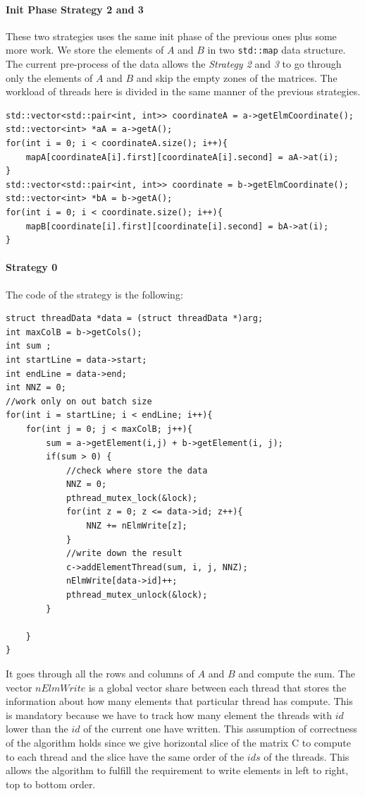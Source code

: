 \documentclass[]{article}
\begin{document}
\paragraph{Init Phase Strategy 2 and 3}
These two strategies uses the same init phase of the previous ones plus some more work.
We store the elements of $A$ and $B$ in two \texttt{std::map} data structure. The current pre-process of the data allows the \textit{Strategy 2} and \textit{3} to go through only the elements of $A$ and $B$ and skip the empty zones of the matrices.
The workload of threads here is divided in the same manner of the previous strategies.
\begin{lstlisting}[style=customc]
std::vector<std::pair<int, int>> coordinateA = a->getElmCoordinate();
std::vector<int> *aA = a->getA();
for(int i = 0; i < coordinateA.size(); i++){
    mapA[coordinateA[i].first][coordinateA[i].second] = aA->at(i);
}
std::vector<std::pair<int, int>> coordinate = b->getElmCoordinate();
std::vector<int> *bA = b->getA();
for(int i = 0; i < coordinate.size(); i++){
    mapB[coordinate[i].first][coordinate[i].second] = bA->at(i);
}
\end{lstlisting}



\label{strategy:0}
\paragraph{Strategy 0}
The code of the strategy is the following:
\begin{lstlisting}[style=customc]
struct threadData *data = (struct threadData *)arg;
int maxColB = b->getCols();
int sum ;
int startLine = data->start;
int endLine = data->end;
int NNZ = 0;
//work only on out batch size
for(int i = startLine; i < endLine; i++){
    for(int j = 0; j < maxColB; j++){
        sum = a->getElement(i,j) + b->getElement(i, j);
        if(sum > 0) {
            //check where store the data
            NNZ = 0;
            pthread_mutex_lock(&lock);
            for(int z = 0; z <= data->id; z++){
                NNZ += nElmWrite[z];
            }
            //write down the result
            c->addElementThread(sum, i, j, NNZ);
            nElmWrite[data->id]++;
            pthread_mutex_unlock(&lock);
        }
    
    }
}
\end{lstlisting}
It goes through all the rows and columns of $A$ and $B$ and compute the sum.
The vector $nElmWrite$ is a global vector share between each thread that stores the information about how many elements that particular thread has compute. This is mandatory because we have to track how many element the threads with $id$ lower than the $id$ of the current one have written. This assumption of correctness of the algorithm holds since we give horizontal slice of the matrix C to compute to each thread and the slice have the same order of the $ids$ of the threads. This allows the algorithm to fulfill the requirement to write elements in left to right, top to bottom order.
\end{document}
